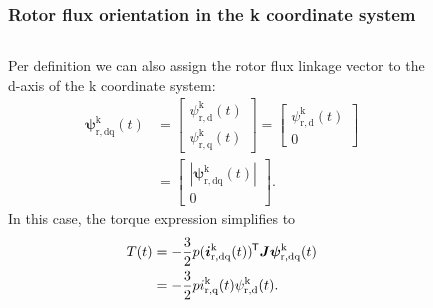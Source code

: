 \begin{frame}
	\frametitle{Rotor flux orientation in the k coordinate system}
    \begin{columns}
		\begin{column}{0.55\textwidth}
	       Per definition we can also assign the rotor flux linkage vector to the d-axis of the k coordinate system:
              \begin{equation}
                \renewcommand{\arraystretch}{1.4}
                \begin{split}
                 \bm{\psi}^\mathrm{k}_\mathrm{r,dq}(t) &= \begin{bmatrix} \psi_{\mathrm{r,d}}^\mathrm{k}(t) \\ \psi_{\mathrm{r,q}}^\mathrm{k}(t) \end{bmatrix} = \begin{bmatrix} \psi_{\mathrm{r,d}}^\mathrm{k}(t) \\ 0 \end{bmatrix}\\
                 &= \begin{bmatrix}|\bm{\psi}^\mathrm{k}_\mathrm{r,dq}(t)| \\ 0 \end{bmatrix}.
                \end{split}
              \end{equation}
              In this case, the torque expression simplifies to
                \begin{equation}
                \begin{split}
                T(t) & = -\frac{3}{2} p (\bm{i}^\mathrm{k}_\mathrm{r,dq}(t))^{\mkern-1.5mu\mathsf{T}}\bm{J}\bm{\psi}^\mathrm{k}_\mathrm{r,dq}(t)\\
                & = -\frac{3}{2} p i_{\mathrm{r,q}}^\mathrm{k}(t)\psi_{\mathrm{r,d}}^\mathrm{k}(t) .
                \end{split}
                \end{equation}
        \end{column}
        \begin{column}{0.45\textwidth}
            \begin{figure}
                \centering

\end{figure}
\end{column}
\end{columns}
\end{frame}
